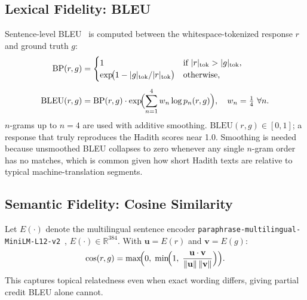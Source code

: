\documentclass{article}
\begin{document}
\subsection{Lexical Fidelity: BLEU}
\label{sec:bleu}
Sentence-level BLEU~\cite{bleu} is computed between the whitespace-tokenized
response $r$ and ground truth $g$:
\begin{align}
  \mathrm{BP}(r,g) &=
    \begin{cases}
      1 & \text{if } |r|_{\text{tok}} > |g|_{\text{tok}}, \\
      \exp\!\bigl(1 - |g|_{\text{tok}}/|r|_{\text{tok}}\bigr)
        & \text{otherwise,}
    \end{cases}
  \label{eq:bp} \\[4pt]
  \mathrm{BLEU}(r,g) &=
    \mathrm{BP}(r,g)\cdot
    \exp\!\Bigl(\sum_{n=1}^{4} w_n \log p_n(r,g)\Bigr),
    \quad w_n = \tfrac{1}{4}\ \forall n.
  \label{eq:bleu}
\end{align}
$n$-grams up to $n{=}4$ are used with additive smoothing. $\mathrm{BLEU}(r,g)
\in [0,1]$; a response that truly reproduces the Hadith scores near 1.0.
Smoothing is needed because unsmoothed BLEU collapses to zero whenever any
single $n$-gram order has no matches, which is common given how short Hadith
texts are relative to typical machine-translation segments.

\subsection{Semantic Fidelity: Cosine Similarity}
\label{sec:cosine}
Let $E(\cdot)$ denote the multilingual sentence encoder
\texttt{paraphrase-multilingual-MiniLM-L12-v2}~\cite{sbert}, $E(\cdot)\in\mathbb{R}^{384}$.
With $\mathbf{u}=E(r)$ and $\mathbf{v}=E(g)$:
\begin{equation}
  \mathrm{cos}(r,g)
    = \max\!\Bigl(0,\;\min\!\Bigl(1,\;
        \frac{\mathbf{u}\cdot\mathbf{v}}
             {\lVert\mathbf{u}\rVert\,\lVert\mathbf{v}\rVert}
      \Bigr)\Bigr).
  \label{eq:cosine}
\end{equation}
This captures topical relatedness even when exact wording differs, giving
partial credit BLEU alone cannot.
\end{document}
